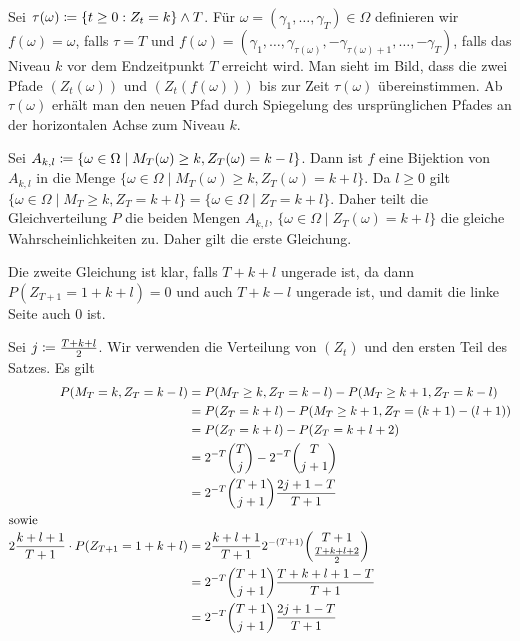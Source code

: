 \documentclass[a4paper,twoside,DIV15,BCOR12mm]{scrbook}
\begin{document}
\begin{center}
\end{center}
\begin{beweis}
Sei $\tau(\omega) \da \{ t\ge 0: Z_t = k\} \wedge T$. Für $\omega=(\gamma_1,\ldots,\gamma_T)\in \Omega$ definieren wir $f(\omega) = \omega$, falls $\tau = T$ und $f(\omega) = (\gamma_1,\ldots,\gamma_{\tau(\omega)},-\gamma_{\tau(\omega)+1},\ldots,-\gamma_T)$, falls das Niveau $k$ vor dem Endzeitpunkt $T$ erreicht wird. Man sieht im Bild, dass die zwei Pfade $(Z_t(\omega))$ und $(Z_t(f(\omega)))$ bis zur Zeit $\tau(\omega)$ übereinstimmen. Ab $\tau(\omega)$ erhält man den neuen Pfad durch Spiegelung des ursprünglichen Pfades an der horizontalen Achse zum Niveau $k$.

Sei $A_{k,l} \da \{\omega\in\Omega\mid M_T(\omega) \ge k, Z_T(\omega) = k -l\}$. Dann ist $f$ eine Bijektion von $A_{k,l}$ in die Menge $\{\omega\in\Omega\mid M_T(\omega) \ge k, Z_T(\omega) = k + l\}$. Da $l\ge 0$ gilt $\{\omega\in\Omega\mid M_T\ge k, Z_T = k+l\} = \{\omega\in\Omega\mid Z_T = k+l\}$. Daher teilt die Gleichverteilung $P$ die beiden Mengen $A_{k,l}$, $\{\omega\in\Omega\mid Z_T(\omega) = k+l\}$ die gleiche Wahrscheinlichkeiten zu. Daher gilt die erste Gleichung.

Die zweite Gleichung ist klar, falls $T + k + l$ ungerade ist, da dann $P(Z_{T+1} = 1 + k + l) = 0$ und auch $T+k-l$ ungerade ist, und damit die linke Seite auch $0$ ist.

Sei $j \da\frac{T+k+l}2$.  Wir verwenden die Verteilung von $(Z_t)$ und den ersten Teil des Satzes.  Es gilt
\begin{align*}
P(M_T=k,Z_T = k-l) &= P(M_T\ge k, Z_T = k-l) - P(M_T\ge k+1 , Z_T = k-l) \\
&= P(Z_T = k+l) - P(M_T \ge k+1, Z_T=(k+1)-(l+1)) \\
&= P(Z_T = k+l) - P(Z_T = k+l+2) \\
&= 2^{-T} \binom{T}{j} - 2^{-T} \binom{T}{j+1} \\
&= 2^{-T} \binom{T+1}{j+1} \frac{2j+1-T}{T+1} \\
\intertext{sowie}
2 \frac{k+l+1}{T+1} \cdot P (Z_{T+1} = 1 + k +l) &= 2\frac{k+l+1}{T+1} 2^{-(T+1)} \binom{T+1}{\frac{T+k+l+2}2} \\
&= 2^{-T} \binom{T+1}{j+1}\frac{T+k+l+1-T}{T+1}  \\
&= 2^{-T} \binom{T+1}{j+1}\frac{2j+1-T}{T+1} 
\end{align*}
\end{beweis}
\end{document}
